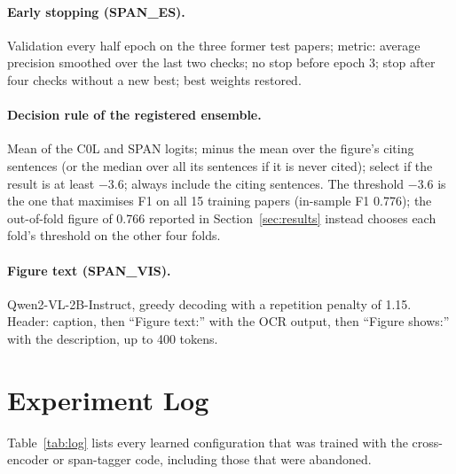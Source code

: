 \paragraph{Early stopping (SPAN\_ES).} Validation every half epoch on the three former test papers; metric:
average precision smoothed over the last two checks; no stop before epoch 3; stop after four checks without
a new best; best weights restored.

\paragraph{Decision rule of the registered ensemble.} Mean of the C0L and SPAN logits; minus the mean over
the figure's citing sentences (or the median over all its sentences if it is never cited); select if the
result is at least $-3.6$; always include the citing sentences. The threshold $-3.6$ is the one that maximises F1 on all 15 training papers
(in-sample F1 0.776); the out-of-fold figure of 0.766 reported in Section~\ref{sec:results} instead chooses each fold's
threshold on the other four folds.

\paragraph{Figure text (SPAN\_VIS).} Qwen2-VL-2B-Instruct, greedy decoding with a repetition penalty of 1.15.
Header: caption, then ``Figure text:'' with the OCR output, then ``Figure shows:'' with the description, up to
400 tokens.

\section{Experiment Log}
\label{app:log}

Table~\ref{tab:log} lists every learned configuration that was trained with the cross-encoder or span-tagger
code, including those that were abandoned.

